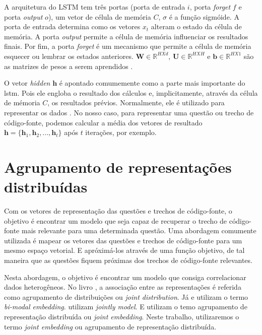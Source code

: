 A arquitetura do LSTM tem três portas (porta de entrada $i$, porta \textit{forget} $f$ e porta \textit{output} $o$), um vetor de célula de memória $C$, $\sigma$ é a função sigmóide. A porta de entrada determina como os vetores $x_{t}$ alteram o estado da célula de memória. A porta \textit{output} permite a célula de memória influenciar os resultados finais. Por fim, a porta \textit{forget} é um mecanismo que permite a célula de memória esquecer ou lembrar os estados anteriores. $\bm{W} \in \mathbb{R}^{H X d}$, $\bm{U} \in \mathbb{R}^{H X H}$ e $\bm{b} \in \mathbb{R}^{H X 1}$ são as matrizes de pesos a serem aprendidos \citep{tan-lstm-qa}.

O vetor \textit{hidden} $\bm{h}$ é apontado comumemente como a parte mais importante do \acrshort{lstm}. Pois ele engloba o resultado dos cálculos e, implicitamente, através da célula de mémoria $C$, os resultados prévios. Normalmente, ele é utilizado para representar os dados \citep{tom-young:trends-deep-learning-nlp}.
No nosso caso, para representar uma questão ou trecho de código-fonte, podemos calcular a média dos vetores de resultado $\bm{h} = \{ \bm{h}_{1}, \bm{h}_{2}, . . ., \bm{h}_t \}$ após $t$ iterações, por exemplo.

\section{Agrupamento de representações distribuídas}

Com os vetores de representação das questões e trechos de código-fonte, o objetivo é encontrar um modelo que seja capaz de recuperar o trecho de código-fonte mais relevante para uma determinada questão. Uma abordagem comumente utilizada é mapear os vetores das questões e trechos de código-fonte para um mesmo espaço vetorial. E apróximá-los através de uma função objetivo, de tal maneira que as questões fiquem próximas dos trechos de código-fonte relevantes. 

Nesta abordagem, o objetivo é encontrar um modelo que consiga correlacionar dados heterogêneos. No livro \cite{Goodfellow-et-al-2016}, a associação entre as representações é referida como agrupamento de distribuições ou \textit{joint distribution}. Já \cite{cambronero-deep-learning-code-search:2019} e \cite{Allamanis-bimodal-source-code-natural-language:2015} utilizam o termo \textit{bi-modal embedding}. \cite{Zhang:2019:deep-learning-recommender-survey} utilizam \textit{jointly model}. E \cite{Gu-deep-code-search:2018} utilizam o temo agrupamento de representação distribuída ou \textit{joint embedding}. Neste trabalho, utilizaremos o termo \textit{joint embedding} ou agrupamento de representação distribuída.


